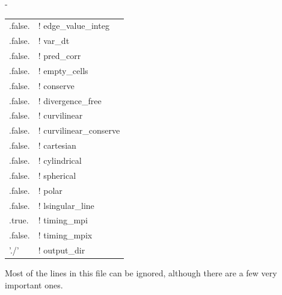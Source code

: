\documentclass[paper=a4, fontsize=11pt,twoside,bibtotoc]{scrartcl}		%
\newenvironment{codebox}{\begin{center}\begin{MakeFramed}{\hsize0.99\linewidth\advance\hsize-\width\FrameRestore}\tt}{\end{MakeFramed}\end{center}}
\begin{document}
\begin{codebox}
\begin{tabular}{ll}
		.false.                    & ! edge\_value\_integ	\\
		.false.                    & ! var\_dt\\
		.false.                    & ! pred\_corr\\
		.false.                    & ! empty\_cells\\
		.false.                    & ! conserve\\
		.false.                    & ! divergence\_free\\
		.false.                    & ! curvilinear\\
		.false.                    & ! curvilinear\_conserve\\
		.false.                    & ! cartesian\\
		.false.                    & ! cylindrical\\
		.false.                    & ! spherical\\
		.false.                    & ! polar\\
		.false.                    & ! lsingular\_line\\
		.true.                     & ! timing\_mpi\\
		.false.                    & ! timing\_mpix\\
		'./'                       & ! output\_dir\\
	\end{tabular}
\end{codebox}

Most of the lines in this file can be ignored, although there are a few very important ones.
\end{document}
